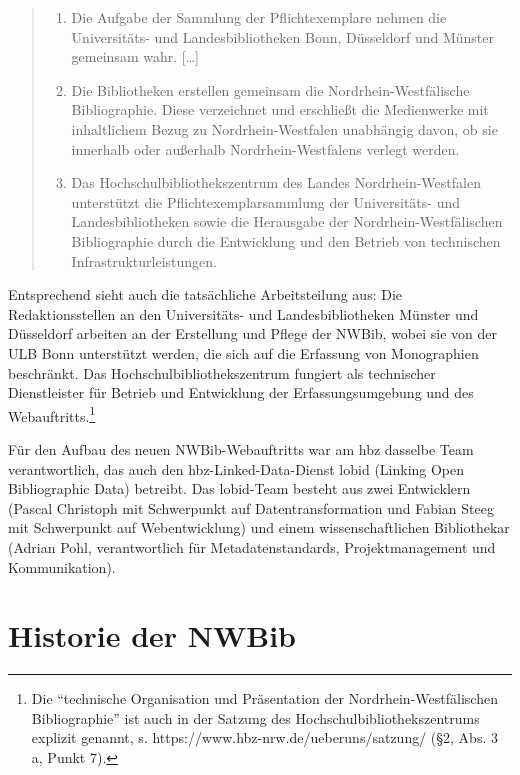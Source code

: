 \documentclass[a4paper,
fontsize=11pt,
oneside,
numbers=noperiodatend,
parskip=half-,
bibliography=totoc,
final
]{scrartcl}
\begin{document}
\begin{quote}
\begin{enumerate}
\def\labelenumi{(\arabic{enumi})}
\item
  Die Aufgabe der Sammlung der Pflichtexemplare nehmen die Uni\-ver\-si\-täts-
  und Landesbibliotheken Bonn, Düsseldorf und Münster gemeinsam wahr.
  {[}\ldots{}{]}
\item
  Die Bibliotheken erstellen gemeinsam die Nordrhein-Westfälische
  Bibliographie. Diese verzeichnet und erschließt die Medienwerke mit
  inhaltlichem Bezug zu Nordrhein-West\-falen unabhängig davon, ob sie
  innerhalb oder außerhalb Nordrhein-West\-falens verlegt werden.
\item
  Das Hochschulbibliothekszentrum des Landes Nordrhein-West\-falen
  unterstützt die Pflichtexemplarsammlung der Uni\-ver\-si\-täts- und
  Landesbibliotheken sowie die Herausgabe der Nordrhein-Westfälischen
  Bibliographie durch die Entwicklung und den Betrieb von technischen
  Infrastrukturleistungen.
\end{enumerate}
\end{quote}

Entsprechend sieht auch die tatsächliche Arbeitsteilung aus: Die
Redaktionsstellen an den Uni\-ver\-si\-täts- und Landesbibliotheken Münster
und Düsseldorf arbeiten an der Erstellung und Pflege der NWBib, wobei
sie von der ULB Bonn unterstützt werden, die sich auf die Erfassung von
Monographien beschränkt. Das Hochschulbibliothekszentrum fungiert als
technischer Dienstleister für Betrieb und Entwicklung der
Erfassungsumgebung und des Webauftritts.\footnote{Die
  \enquote{technische Organisation und Präsentation der
  Nordrhein-Westfälischen Bibliographie} ist auch in der Satzung des
  Hochschulbibliothekszentrums explizit genannt, s.
  https://www.hbz-nrw.de/ueberuns/satzung/ (§2, Abs. 3 a, Punkt 7).}

Für den Aufbau des neuen NWBib-Webauftritts war am hbz dasselbe Team
verantwortlich, das auch den hbz-Linked-Data-Dienst lobid (Linking Open
Bibliographic Data) betreibt. Das lobid-Team besteht aus zwei
Entwicklern (Pascal Christoph mit Schwerpunkt auf Datentransformation
und Fabian Steeg mit Schwerpunkt auf Webentwicklung) und einem
wissenschaftlichen Bibliothekar (Adrian Pohl, verantwortlich für
Metadatenstandards, Projektmanagement und Kommunikation).

\section*{Historie der NWBib}\label{historie-der-nwbib}
\end{document}
